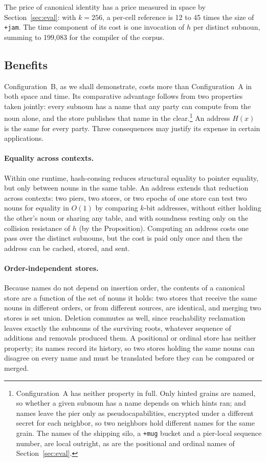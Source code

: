 \documentclass[twoside]{article}
\begin{document}
The price of canonical identity has a price measured in space by Section~\ref{sec:eval}:  with $k = 256$, a per-cell reference is 12 to 45 times the size of \texttt{+jam}.  The time component of its cost is one invocation of $h$ per distinct subnoun, summing to 199,083 for the compiler of the corpus.

\subsection{Benefits}
\label{sec:cas-buys}

Configuration~B, as we shall demonstrate, costs more than Configuration~A in both space and time.  Its comparative advantage follows from two properties taken jointly:  every subnoun has a name that any party can compute from the noun alone, and the store publishes that name in the clear.\footnote{Configuration~A has neither property in full.  Only hinted grains are named, so whether a given subnoun has a name depends on which hints ran; and names leave the pier only as pseudocapabilities, encrypted under a different secret for each neighbor, so two neighbors hold different names for the same grain.  The names of the shipping silo, a \texttt{+mug} bucket and a pier-local sequence number, are local outright, as are the positional and ordinal names of Section~\ref{sec:eval}.}  An address $H(x)$ is the same for every party.  Three consequences may justify its expense in certain applications.

\paragraph*{Equality across contexts.}  Within one runtime, hash-consing reduces structural equality to pointer equality, but only between nouns in the same table.  An address extends that reduction across contexts:  two piers, two stores, or two epochs of one store can test two nouns for equality in $O(1)$ by comparing $k$-bit addresses, without either holding the other's noun or sharing any table, and with soundness resting only on the collision resistance of $h$ (by the Proposition).  Computing an address costs one pass over the distinct subnouns, but the cost is paid only once and then the address can be cached, stored, and sent.

\paragraph*{Order-independent stores.}  Because names do not depend on insertion order, the contents of a canonical store are a function of the set of nouns it holds:  two stores that receive the same nouns in different orders, or from different sources, are identical, and merging two stores is set union.  Deletion commutes as well, since reachability reclamation leaves exactly the subnouns of the surviving roots, whatever sequence of additions and removals produced them.  A positional or ordinal store has neither property; its names record its history, so two stores holding the same nouns can disagree on every name and must be translated before they can be compared or merged.
\end{document}
